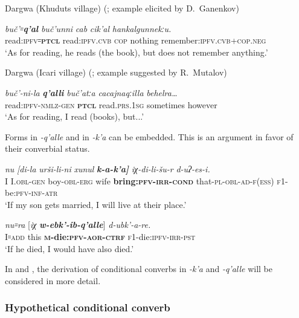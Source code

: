 ﻿\documentclass[output=paper]{langsci/langscibook}
\begin{document}
Dargwa (Khuduts village) (\citealt{maisak2010}; example elicited by D.~Ganenkov)

\ea %
\gll \emph{buč'꞊\textbf{q'al}} \emph{buč'unni} \emph{cab} \emph{cik'al} \emph{hankalgunnekːu.}\\
read:\textsc{ipfv}꞊\textbf{\textsc{ptcl}} read:\textsc{ipfv}.\textsc{cvb} \textsc{cop} nothing  remember:\textsc{ipfv}.\textsc{cvb}+\textsc{cop}.\textsc{neg}\\
\glt `As for reading, he reads (the book), but does not remember anything.'
\z

Dargwa (Icari village) (\citealt{maisak2010}; example suggested by R.~Mutalov)

\ea %
\gll \emph{buč'-ni-la} \emph{\textbf{q'alli}} \emph{buč'atːa} \emph{cacajnaqːilla} \emph{behelra\ldots{}}\\
 read:\textsc{ipfv}-\textsc{nmlz}-\textsc{gen} \textbf{\textsc{ptcl}} read.\textsc{prs}.\textsc{1sg} sometimes  however\\
\glt `As for reading, I read (books), but...'
\z

Forms in \emph{-q'alle} and in \emph{-k'a} can be embedded. This is an
argument in favor of their converbial status.

\ea %
\gll \emph{nu} \emph{[di-la} \emph{urši-li-ni} \emph{xunul} \emph{\textbf{k-a-k'a]}} \emph{iχ-di-li-šu-r} \emph{d-uʔ-es-i.}\\
 I I.\textsc{obl}-\textsc{gen} boy-\textsc{obl}-\textsc{erg} wife  \textbf{bring:\textsc{pfv}-\textsc{irr}-\textsc{cond}} that-\textsc{pl}-\textsc{obl}-\textsc{ad}-\textsc{f}(\textsc{ess}) 
\textsc{f1}-be:\textsc{pfv}-\textsc{inf}-\textsc{atr} \\
\glt `If my son gets married, I will live at their place.'

\ex %
\gll \emph{nu꞊ra} [\emph{iχ} \emph{\textbf{w-ebk'-ib-q'alle}}] \emph{d-ubk'-a-re.}\\
 I꞊\textsc{add} this \textbf{\textsc{m}-die:\textsc{pfv}-\textsc{aor}-\textsc{ctrf}} \textsc{f1}-die:\textsc{ipfv}-\textsc{irr}-\textsc{pst}\\
\glt `If he died, I would have also died.'
\z

In  and , the derivation of conditional converbs in
\emph{-k'a} and \emph{-q'alle} will be considered in more detail.

\subsubsection{Hypothetical conditional converb}\label{hypothetical-conditional-converb}
\end{document}
